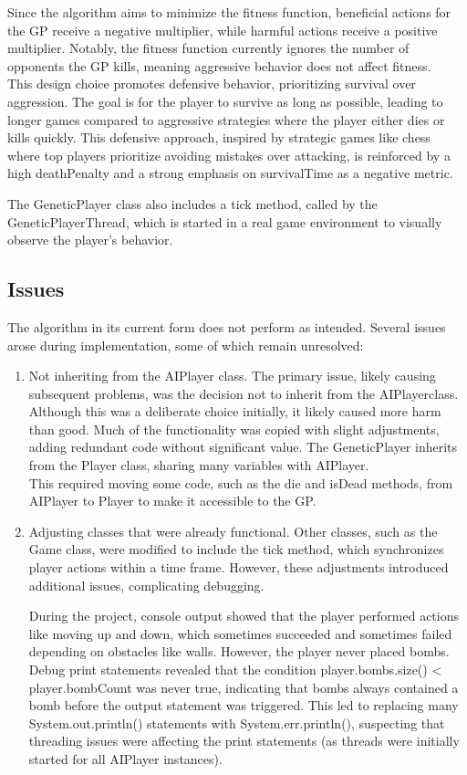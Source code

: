 \documentclass[sigconf]{acmart} %
\begin{document}
\begin{enumerate}
Since the algorithm aims to minimize the fitness function, beneficial actions for the GP receive a negative multiplier, while harmful actions receive a positive multiplier. Notably, the fitness function currently ignores the number of opponents the GP kills, meaning aggressive behavior does not affect fitness. \\
This design choice promotes defensive behavior, prioritizing survival over aggression. The goal is for the player to survive as long as possible, leading to longer games compared to aggressive strategies where the player either dies or kills quickly. This defensive approach, inspired by strategic games like chess where top players prioritize avoiding mistakes over attacking, is reinforced by a high deathPenalty and a strong emphasis on survivalTime as a negative metric.

The GeneticPlayer class also includes a tick method, called by the GeneticPlayerThread, which is started in a real game environment to visually observe the player's behavior. 

\subsection{Issues}
The algorithm in its current form does not perform as intended. Several issues arose during implementation, some of which remain unresolved: 
\begin{enumerate}
      \item Not inheriting from the AIPlayer class. 
      The primary issue, likely causing subsequent problems, was the decision not to inherit from the AIPlayerclass. Although this was a deliberate choice initially, it likely caused more harm than good. Much of the functionality was copied with slight adjustments, adding redundant code without significant value. The GeneticPlayer inherits from the Player class, sharing many variables with AIPlayer. \\ 
This required moving some code, such as the die and isDead methods, from AIPlayer to Player to make it accessible to the GP.
      \item Adjusting classes that were already functional. 
      Other classes, such as the Game class, were modified to include the tick method, which synchronizes player actions within a time frame. However, these adjustments introduced additional issues, complicating debugging. 
	  
	During the project, console output showed that the player performed actions like moving up and down, which sometimes succeeded and sometimes failed depending on obstacles like walls. However, the player never placed bombs. Debug print statements revealed that the condition player.bombs.size() < player.bombCount was never true, indicating that bombs always contained a bomb before the output statement was triggered. This led to replacing many System.out.println() statements with System.err.println(), suspecting that threading issues were affecting the print statements (as threads were initially started for all AIPlayer instances). 
 

\end{enumerate}
\end{enumerate}
\end{document}
